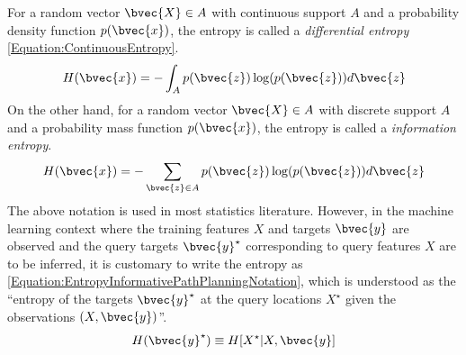 			For a random vector $\bvec{X} \in A$ with continuous support $A$ and a probability density function $p(\bvec{x})$, the entropy is called a \textit{differential entropy} \eqref{Equation:ContinuousEntropy}. \begin{equation}
				H(\bvec{x}) = - \int_{A} p(\bvec{z}) \log(p(\bvec{z})) d\bvec{z}
			\label{Equation:ContinuousEntropy}
			\end{equation} On the other hand, for a random vector $\bvec{X} \in A$ with discrete support $A$ and a probability mass function $p(\bvec{x})$, the entropy is called a \textit{information entropy}. \begin{equation}
				H(\bvec{x}) = - \sum_{\bvec{z} \in A} p(\bvec{z}) \log(p(\bvec{z})) d\bvec{z}
			\label{Equation:DiscreteEntropy}
			\end{equation} The above notation is used in most statistics literature. However, in the machine learning context where the training features $X$ and targets $\bvec{y}$ are observed and the query targets $\bvec{y}^{\star}$ corresponding to query features $X$ are to be inferred, it is customary to write the entropy as \eqref{Equation:EntropyInformativePathPlanningNotation}, which is understood as the ``entropy of the targets $\bvec{y}^{\star}$ at the query locations $X^{\star}$ given the observations $(X, \bvec{y})$''. \begin{equation}
				H(\bvec{y}^{\star}) \equiv H[X^{\star} | X, \bvec{y}]
			\label{Equation:EntropyInformativePathPlanningNotation}
			\end{equation}
			
%	
%		
		
%		
%		
		
